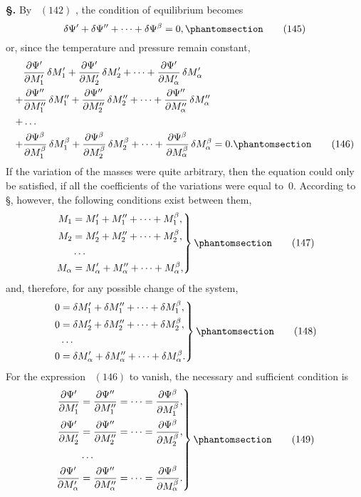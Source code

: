 \documentclass[12pt]{book}[2005/09/16]
\newcommand{\Chg}[2]{#2}
\newcommand{\Add}[1]{\Chg{}{#1}}
\newcommand{\Erratum}[2]{#2}
\newcommand{\Section}[1]{
  \medskip\par\textbf{§\;#1}
  \label{section:#1}
}
\newcommand{\SecRef}[2][§\;]{\hyperref[section:#2.]{{\upshape #1#2}}}
\newcommand{\Tag}[1]{%
  \phantomsection\label{eqn:#1}\tag*{\ensuremath{#1}}%
}
\newcommand{\Eq}[1]{%
  \hyperref[eqn:#1]{\ensuremath{#1}}%
}
\newcommand{\PageSep}[1]{\ignorespaces}
\newcommand{\dd}{\partial}
\begin{document}
\Section{202.} By~\Eq{(142)}, the condition of equilibrium becomes
%
%
\[
\delta \Psi' + \delta \Psi'' + \dots \Add{+} \delta \Psi^{\beta} = 0\Add{,}
\Tag{(145)}
\]
or, since the temperature and pressure remain constant,
\begin{align*}
&\frac{\dd \Psi'}{\dd M_{1}'}\, \delta M_{1}'
  + \frac{\dd \Psi'}{\dd M_{2}'}\, \delta M_{2}'
  + \dots
  + \frac{\dd \Psi'}{\dd M_{\alpha}'}\, \delta M_{\alpha}' \\
%
+ & \frac{\dd \Psi''}{\dd M_{1}''}\, \delta M_{1}''
  + \frac{\dd \Psi''}{\dd M_{2}''}\, \delta M_{2}''
  + \dots
  + \frac{\dd \Psi''}{\dd M_{\alpha}''}\, \delta M_{\alpha}'' \\
+ & \dots \\
%
+ & \frac{\dd \Psi^{\beta}}{\dd M_{1}^{\beta}}\, \delta M_{1}^{\beta}
  + \frac{\dd \Psi^{\beta}}{\dd M_{2}^{\beta}}\, \delta M_{2}^{\beta}
  + \dots
  + \frac{\dd \Psi^{\beta}}{\dd M_{\alpha}^{\beta}}\, \delta M_{\alpha}^{\beta} = 0\Add{.}
\Tag{(146)}
\end{align*}
\PageSep{177}
If the variation of the masses were quite arbitrary, then the
equation could only be satisfied, if all the coefficients of the
variations were equal to~$0$. According to \SecRef{200}, however,
the following conditions exist between them,
\[
\left.
\begin{aligned}
M_{1} &= M_{1}' + M_{1}'' + \dots + M_{1}^{\beta}\Add{,} \\
M_{2} &= M_{2}' + M_{2}'' + \dots + M_{2}^{\beta}\Add{,} \\
  & \dots \\
M_{\alpha} &= M_{\alpha}' + M_{\alpha}'' + \dots + M_{\alpha}^{\beta}\Add{,}
\end{aligned}\right\}
\Tag{(147)}
\]
and, therefore, for any possible change of the system,
\[
\left.
\begin{aligned}
0 &= \delta M_{1}' + \delta M_{1}'' + \dots + \delta M_{1}^{\beta}\Add{,} \\
0 &= \delta M_{2}' + \delta M_{2}'' + \dots + \delta M_{2}^{\beta}\Add{,} \\
  & \dots \\
0 &= \delta M_{\alpha}' + \delta M_{\alpha}'' + \dots + \delta M_{\alpha}^{\beta}\Add{.}
\end{aligned}\right\}
\Tag{(148)}
\]
For the expression~\Eq{(146)} to vanish, the necessary and sufficient
condition is
\[
\left.
\begin{aligned}
\frac{\dd \Psi'}{\dd M_{1}'} &= \frac{\dd \Psi''}{\dd M_{1}''} = \dots = \frac{\dd \Psi^{\beta}}{\dd M_{1}^{\beta}}\Add{,} \\
\frac{\dd \Psi'}{\dd M_{2}'} &= \frac{\dd \Psi''}{\Erratum{}{\dd} M_{2}''} = \dots = \frac{\dd \Psi^{\beta}}{\dd M_{2}^{\beta}}\Add{,} \\
& \dots \\
\frac{\dd \Psi'}{\dd M_{\alpha}'} &= \frac{\dd \Psi''}{\dd M_{\alpha}''} = \dots = \frac{\dd \Psi^{\beta}}{\dd M_{\alpha}^{\beta}}\Add{.}
\end{aligned}\right\}
\Tag{(149)}
\]
\end{document}
